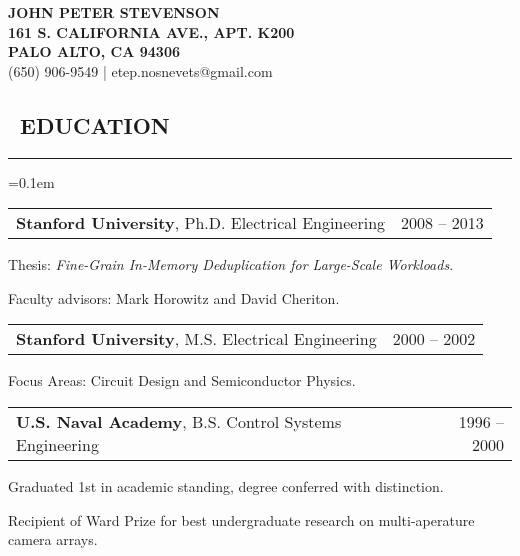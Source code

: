 \documentclass[10pt,letterpaper]{article}
\makeatletter
\newenvironment{changemargin}[2]
{%
    \begin{list}{}{%
        \setlength{\topsep}{0pt}%
        \setlength{\leftmargin}{#1}%
        \setlength{\rightmargin}{#2}%
        \setlength{\listparindent}{\parindent}%
        \setlength{\itemindent}{\parindent}%
        \setlength{\parsep}{\parskip}%
    }%
    \item[]
}%
{%
    \end{list}
}%
\newenvironment{content}
{%
    \begin{changemargin}{0cm}{2.5cm}
    \begin{itemize*}
        \vspace{-0.15em}
}%
{%
    \end{itemize*}
    \end{changemargin}
}%
\newenvironment{resumesection}[1]
{%
    \subsection*{\ #1}
    \vspace{-0.4em}
    \hrule
    \vspace{+0.4em}
    \begin{itemize}
        \parskip=0.1em
}%
{%
    \end{itemize}
}%
\newcommand{\headerrowx}[2]
{\item[] \begin{tabular*}{\linewidth}{l@{\extracolsep{\fill}}r}
	#1 &
	#2 \\
\end{tabular*}}
\makeatother
\begin{document}
\begin{center}
{\LARGE{ \textbf{JOHN PETER STEVENSON}}} \\
\vspace{0.5em}
\footnotesize{\textbf{161 S. CALIFORNIA AVE., APT. K200}}  \\
\footnotesize{\textbf{PALO ALTO, CA 94306              }}  \\
\footnotesize{{(650) 906-9549} | {etep.nosnevets@gmail.com}}
\end{center}

\begin{resumesection}{EDUCATION}
    \headerrowx{ \textbf{Stanford University}, Ph.D. Electrical Engineering} {2008 -- 2013}
    \begin{content}
        \item[] Thesis: \emph{Fine-Grain In-Memory Deduplication for Large-Scale Workloads}.
        \item[] Faculty advisors: Mark Horowitz and David Cheriton.
    \end{content}
    
    \headerrowx{ \textbf{Stanford University}, M.S. Electrical Engineering} {2000 -- 2002}
    \begin{content}
    	\item[] Focus Areas: Circuit Design and Semiconductor Physics.
    \end{content}
    
    \headerrowx{ \textbf{U.S. Naval Academy}, B.S. Control Systems Engineering} {1996 -- 2000}
    \begin{content}
    	\item[] Graduated 1st in academic standing, degree conferred with distinction.
    	\item[] Recipient of Ward Prize for best undergraduate research on multi-aperature camera arrays.
    \end{content}
\end{resumesection}
\end{document}
